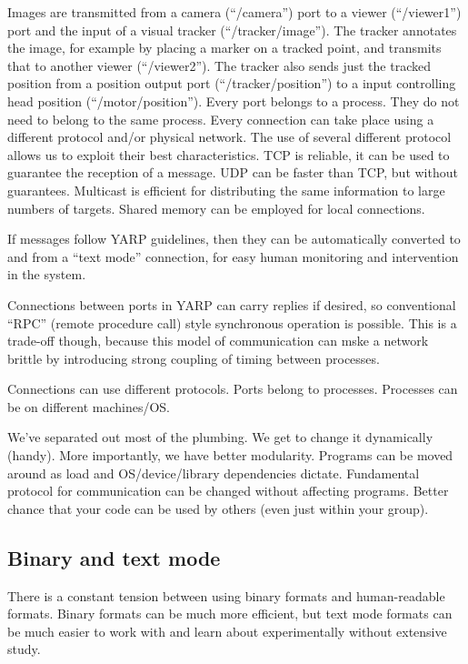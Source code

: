 Images are transmitted from a camera (``/camera'') port to a viewer
(``/viewer1'') port and the input of a visual tracker
(``/tracker/image''). The tracker annotates the image, for example by
placing a marker on a tracked point, and transmits that to another
viewer (``/viewer2''). The tracker also sends just the tracked position
from a position output port (``/tracker/position'') to a input
controlling head position (``/motor/position''). Every port belongs to a
process. They do not need to belong to the same process. Every
connection can take place using a different protocol and/or physical
network. The use of several different protocol allows us to exploit
their best characteristics.
TCP is reliable, it can be used to guarantee the reception of a message.
UDP can be faster than TCP, but without guarantees.
Multicast is efficient for distributing the same information to large
numbers of targets.
Shared memory can be employed for local connections.

If messages follow YARP guidelines, then they can be
automatically converted to and from a ``text mode'' connection, for easy
human monitoring and intervention in the system.

Connections between ports in YARP can carry replies if desired,
so conventional ``RPC'' (remote procedure call) style synchronous
operation is possible.  This is a trade-off though, because this
model of communication can mske a network brittle by introducing
strong coupling of timing between processes.

Connections can use different protocols.
Ports belong to processes.
Processes can be on different machines/OS.

We've separated out most of the plumbing.  We get to change it dynamically (handy).  More importantly, we have better modularity.
Programs can be moved around as load and OS/device/library
 dependencies dictate.
Fundamental protocol for communication can be changed without 
affecting programs.
Better chance that your code can be used by others (even just within 
your group).



\subsection{Binary and text mode}

There is a constant tension between using binary formats and
human-readable formats.  Binary formats can be much more efficient,
but text mode formats can be much easier to work with and learn about
experimentally without extensive study.

